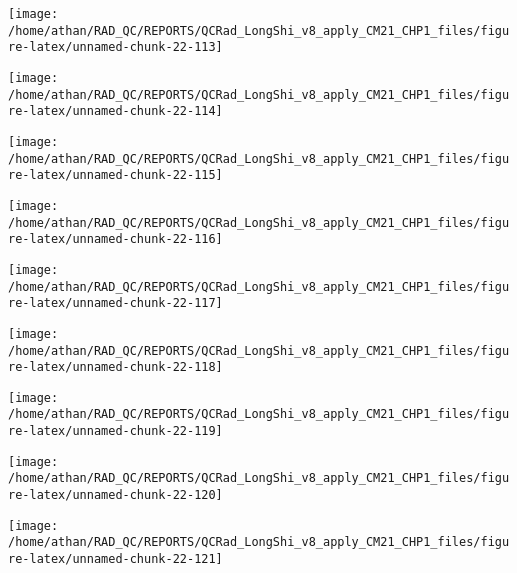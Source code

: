 \documentclass[
  10pt,
  a4paper,oneside]{article}
\begin{document}
\begin{center}\texttt{[image: /home/athan/RAD\_QC/REPORTS/QCRad\_LongShi\_v8\_apply\_CM21\_CHP1\_files/figure-latex/unnamed-chunk-22-113]} \end{center}

\begin{center}\texttt{[image: /home/athan/RAD\_QC/REPORTS/QCRad\_LongShi\_v8\_apply\_CM21\_CHP1\_files/figure-latex/unnamed-chunk-22-114]} \end{center}

\begin{center}\texttt{[image: /home/athan/RAD\_QC/REPORTS/QCRad\_LongShi\_v8\_apply\_CM21\_CHP1\_files/figure-latex/unnamed-chunk-22-115]} \end{center}

\begin{center}\texttt{[image: /home/athan/RAD\_QC/REPORTS/QCRad\_LongShi\_v8\_apply\_CM21\_CHP1\_files/figure-latex/unnamed-chunk-22-116]} \end{center}

\begin{center}\texttt{[image: /home/athan/RAD\_QC/REPORTS/QCRad\_LongShi\_v8\_apply\_CM21\_CHP1\_files/figure-latex/unnamed-chunk-22-117]} \end{center}

\begin{center}\texttt{[image: /home/athan/RAD\_QC/REPORTS/QCRad\_LongShi\_v8\_apply\_CM21\_CHP1\_files/figure-latex/unnamed-chunk-22-118]} \end{center}

\begin{center}\texttt{[image: /home/athan/RAD\_QC/REPORTS/QCRad\_LongShi\_v8\_apply\_CM21\_CHP1\_files/figure-latex/unnamed-chunk-22-119]} \end{center}

\begin{center}\texttt{[image: /home/athan/RAD\_QC/REPORTS/QCRad\_LongShi\_v8\_apply\_CM21\_CHP1\_files/figure-latex/unnamed-chunk-22-120]} \end{center}

\begin{center}\texttt{[image: /home/athan/RAD\_QC/REPORTS/QCRad\_LongShi\_v8\_apply\_CM21\_CHP1\_files/figure-latex/unnamed-chunk-22-121]} \end{center}
\end{document}
